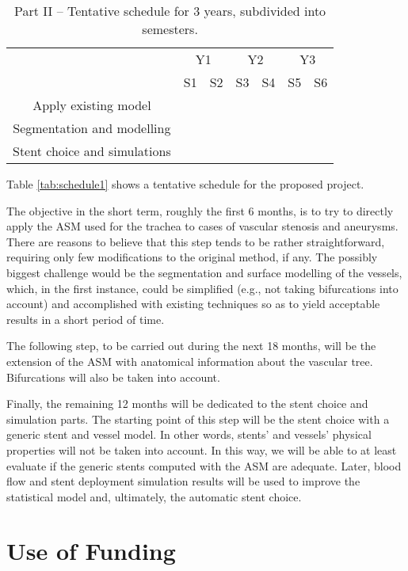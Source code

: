 \begin{table}[h]\centering
\begin{tabular}{c|c|c|c|c|c|c|}
\cline{2-7}
 & \multicolumn{2}{|c|}{Y1} & \multicolumn{2}{|c|}{Y2} & \multicolumn{2}{|c|}{Y3} \\ \cline{2-7}
 & S1 & S2 & S3 & S4 & S5 & S6 \\ \hline
\multicolumn{1}{|c|}{Apply existing model} & \cellcolor{green} & & & & & \\ \hline
\multicolumn{1}{|c|}{Segmentation and modelling} & & \cellcolor{green} & \cellcolor{green} & \cellcolor{green} & & \\ \hline
\multicolumn{1}{|c|}{Stent choice and simulations} & & & & & \cellcolor{green} & \cellcolor{green} \\ \hline
\end{tabular}
\caption{Part II -- Tentative schedule for 3 years, subdivided into semesters.}
\label{tab:schedule2}
\end{table}

Table \ref{tab:schedule1} shows a tentative schedule for the proposed project. 

The objective in the short term, roughly the first 6 months, is to try to directly apply the ASM used for the trachea to cases of vascular stenosis and aneurysms. There are reasons to believe that this step tends to be rather straightforward, requiring only few modifications to the original method, if any. The possibly biggest challenge would be the segmentation and surface modelling of the vessels, which, in the first instance, could be simplified (e.g., not taking bifurcations into account) and accomplished with existing techniques so as to yield acceptable results in a short period of time. 

The following step, to be carried out during the next 18 months, will be the extension of the ASM with anatomical information about the vascular tree. Bifurcations will also be taken into account. 

Finally, the remaining 12 months will be dedicated to the stent choice and simulation parts. The starting point of this step will be the stent choice with a generic stent and vessel model. In other words, stents' and vessels' physical properties will not be taken into account. In this way, we will be able to at least evaluate if the generic stents computed with the ASM are adequate. Later, blood flow and stent deployment simulation results will be used to improve the statistical model and, ultimately, the automatic stent choice.  

\section{Use of Funding}
